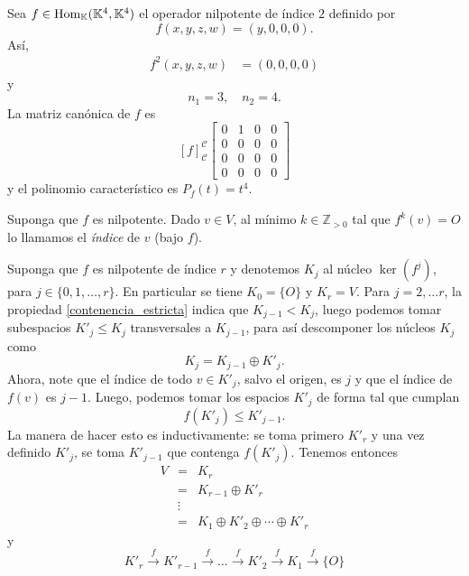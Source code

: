 \begin{ejem}\label{ejnil4}
Sea $f\in\operatorname{Hom}_{\mathbb{K}}(\mathbb{K}^4,\mathbb{K}^4)$ el operador nilpotente de índice $2$ definido por
$$f(x,y,z,w)=(y,0,0,0).$$
As\'i,
\begin{align*}
f^2(x,y,z,w) & = (0,0,0,0)
\end{align*}
y
$$n_1=3,\quad n_2=4.$$
La matriz canónica de $f$ es
$$
\left[f\right]^{\mathcal{C}}_{\mathcal{C}}\left[\begin{array}{rr|r|r}
0 & 1 & 0 & 0\\
0 & 0 & 0 & 0\\
\hline
0 & 0 & 0 & 0\\
\hline
0 & 0 & 0 & 0
\end{array}\right]
$$
y el polinomio caracter\'istico es $P_f(t)=t^4$.
\end{ejem}

\begin{defn}
  Suponga que $f$ es nilpotente. Dado $v\in V$, al mínimo $k\in\mathbb{Z}_{>0}$ tal que $f^k(v)=O$ lo llamamos el \emph{índice} de $v$ (bajo $f$).
\end{defn}

\begin{obs}\label{descomposicion_de_nucleos}
  Suponga que $f$ es nilpotente de índice $r$ y denotemos $K_j$ al núcleo $\ker(f^j)$, para $j\in\{0,1,\ldots,r\}$. En particular se tiene $K_0=\{O\}$ y $K_r=V$. Para $j=2,\ldots r$, la propiedad \ref{contenencia_estricta} indica que $K_{j-1}<K_{j}$, luego podemos tomar subespacios $K'_j\le K_j$ transversales a $K_{j-1}$, para así descomponer los núcleos $K_j$ como
\[
K_j=K_{j-1}\oplus K'_j.
\]
  Ahora, note que el índice de todo $v\in K'_j$, salvo el origen, es $j$ y que el índice de $f(v)$ es $j-1$. Luego, podemos tomar los espacios $K'_j$ de forma tal que cumplan
  \[
  f\left(K'_j\right)\le K'_{j-1}.
  \]
  La manera de hacer esto es inductivamente: se toma primero $K'_{r}$ y una vez definido $K'_{j}$, se toma $K'_{j-1}$ que contenga $f(K'_j)$. Tenemos entonces
  \begin{eqnarray*}
  V & = & K_r\\
     & = & K_{r-1}\oplus K'_r\\
     & \vdots &\\
     & = & K_1\oplus K'_2\oplus\cdots\oplus K'_r
  \end{eqnarray*}
  y
  \[
  K'_r\overset{f}\longrightarrow K'_{r-1}\overset{f}\longrightarrow\ldots\overset{f}\longrightarrow K'_2\overset{f}\longrightarrow K_1\overset{f}\longrightarrow \{O\}
  \]
\end{obs}

